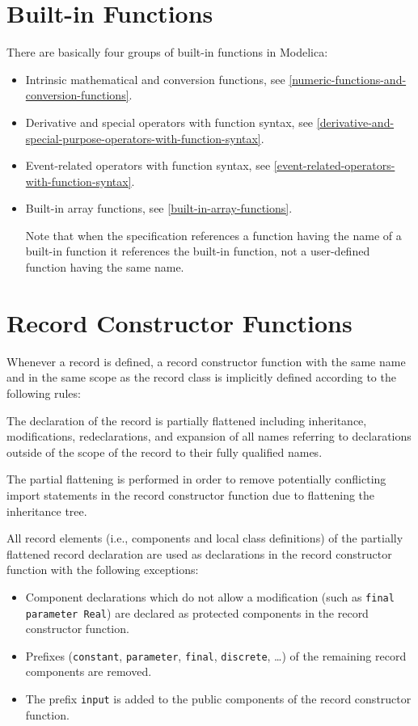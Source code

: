 \section{Built-in Functions}\label{built-in-functions}

There are basically four groups of built-in functions in Modelica:
\begin{itemize}
\item
  Intrinsic mathematical and conversion functions, see \cref{numeric-functions-and-conversion-functions}.
\item
  Derivative and special operators with function syntax,
  see \cref{derivative-and-special-purpose-operators-with-function-syntax}.
\item
  Event-related operators with function syntax, see \cref{event-related-operators-with-function-syntax}.
\item
  Built-in array functions, see \cref{built-in-array-functions}.

  Note that when the specification references a function having the name
  of a built-in function it references the built-in function, not a
  user-defined function having the same name.
\end{itemize}

\section{Record Constructor Functions}\label{record-constructor-functions}

Whenever a record is defined, a record constructor function with the
same name and in the same scope as the record class is implicitly
defined according to the following rules:

The declaration of the record is partially flattened including
inheritance, modifications, redeclarations, and expansion of all names
referring to declarations outside of the scope of the record to their
fully qualified names.

\begin{nonnormative}
The partial flattening is performed in order to remove potentially conflicting import statements in the record constructor function due to flattening the inheritance tree.
\end{nonnormative}

All record elements (i.e., components and local class
definitions) of the partially flattened record declaration are used
as declarations in the record constructor function with the following
exceptions:
\begin{itemize}
\item
  Component declarations which do not allow a modification (such
  as \lstinline!final parameter Real!) are declared
  as protected components in the record constructor function.
\item
  Prefixes (\lstinline!constant!, \lstinline!parameter!, \lstinline!final!, \lstinline!discrete!, \ldots) of the remaining
  record components are removed.
\item
  The prefix \lstinline!input! is added to the public components of the record
  constructor function.
\end{itemize}

